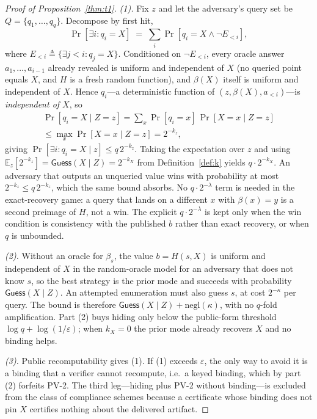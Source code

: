 \documentclass[10pt,journal,compsoc]{IEEEtran}
\begin{document}
\begin{proof}[Proof of Proposition~\ref{thm:t1}]
\emph{(1).} Fix $z$ and let the adversary's query set be
$Q = \{q_1, \dots, q_q\}$. Decompose by first hit,
\[
\Pr[\exists i : q_i = X] \;=\; \sum_i \Pr\!\left[q_i = X \wedge \neg E_{<i}\right],
\]
where $E_{<i} \triangleq \{\exists j < i : q_j = X\}$.
Conditioned on $\neg E_{<i}$, every oracle answer $a_1,\dots,a_{i-1}$ already
revealed is uniform and independent of $X$ (no queried point equals $X$, and $H$
is a fresh random function), and $\beta(X)$ itself is uniform and independent of
$X$. Hence $q_i$---a deterministic function of $(z, \beta(X), a_{<i})$---is
\emph{independent of $X$}, so
\begin{multline*}
\Pr[q_i = X \mid Z = z]
= \sum_x \Pr[q_i = x]\,\Pr[X = x \mid Z = z] \\
\le \max_x \Pr[X = x \mid Z = z] = 2^{-k_z},
\end{multline*}
giving $\Pr[\exists i : q_i = X \mid z] \le q\,2^{-k_z}$. Taking the expectation
over $z$ and using $\mathbb{E}_z[2^{-k_z}] = \mathsf{Guess}(X \mid Z) = 2^{-k_X}$
from Definition~\ref{def:k} yields $q \cdot 2^{-k_X}$. An adversary that outputs
an unqueried value wins with probability at most $2^{-k_z} \le q\,2^{-k_z}$,
which the same bound absorbs. No $q\cdot2^{-\lambda}$ term is needed in the
exact-recovery game: a query that lands on a different $x$ with
$\beta(x)=y$ is a second preimage of $H$, not a win. The explicit
$q\cdot2^{-\lambda}$ is kept only when the win condition is consistency with the
published $b$ rather than exact recovery, or when $q$ is unbounded.

\emph{(2).} Without an oracle for $\beta_s$, the value $b=H(s,X)$ is uniform and
independent of $X$ in the random-oracle model for an adversary that does not know
$s$, so the best strategy is the prior mode and succeeds with probability
$\mathsf{Guess}(X\mid Z)$. An attempted enumeration must also guess $s$, at cost
$2^{-\kappa}$ per query. The bound is therefore
$\mathsf{Guess}(X\mid Z)+\mathrm{negl}(\kappa)$, with no $q$-fold amplification.
Part (2) buys hiding only below the public-form threshold
$\log q+\log(1/\varepsilon)$; when $k_X=0$ the prior mode already recovers $X$
and no binding helps.

\emph{(3).} Public recomputability gives (1). If (1) exceeds $\varepsilon$, the
only way to avoid it is a binding that a verifier cannot recompute, i.e.\ a keyed
binding, which by part (2) forfeits PV-2. The third leg---hiding plus PV-2
without binding---is excluded from the class of compliance schemes because a
certificate whose binding does not pin $X$ certifies nothing about the delivered
artifact.
\end{proof}
\end{document}
